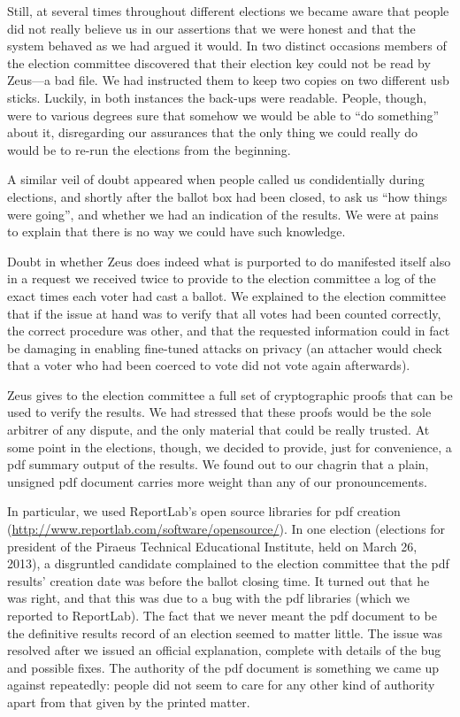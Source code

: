\documentclass[letterpaper,10pt]{article}
\begin{document}
Still, at several times throughout different elections we became aware
that people did not really believe us in our assertions that we were
honest and that the system behaved as we had argued it would. In two
distinct occasions members of the election committee discovered that
their election key could not be read by Zeus---a bad file. We had
instructed them to keep two copies on two different {\sc usb} sticks.
Luckily, in both instances the back-ups were readable. People, though,
were to various degrees sure that somehow we would be able to ``do
something'' about it, disregarding our assurances that the only thing
we could really do would be to re-run the elections from the beginning.

A similar veil of doubt appeared when people called us condidentially
during elections, and shortly after the ballot box had been closed, to
ask us ``how things were going'', and whether we had an indication of
the results. We were at pains to explain that there is no way we could
have such knowledge.

Doubt in whether Zeus does indeed what is purported to do manifested
itself also in a request we received twice to provide to the election
committee a log of the exact times each voter had cast a ballot. We
explained to the election committee that if the issue at hand was to
verify that all votes had been counted correctly, the correct
procedure was other, and that the requested information could in fact
be damaging in enabling fine-tuned attacks on privacy (an attacher
would check that a voter who had been coerced to vote did not vote
again afterwards). 

Zeus gives to the election committee a full set of cryptographic
proofs that can be used to verify the results. We had stressed that
these proofs would be the sole arbitrer of any dispute, and the only
material that could be really trusted. At some point in the elections,
though, we decided to provide, just for convenience, a {\sc pdf}
summary output of the results. We found out to our chagrin that a
plain, unsigned {\sc pdf} document carries more weight than any of our
pronouncements.

In particular, we used ReportLab's open source libraries for {\sc pdf}
creation (\url{http://www.reportlab.com/software/opensource/}). In one
election (elections for president of the Piraeus Technical Educational
Institute, held on March 26, 2013), a disgruntled candidate complained
to the election committee that the {\sc pdf} results' creation date
was before the ballot closing time. It turned out that he was right, and
that this was due to a bug with the {\sc pdf} libraries (which we
reported to ReportLab). The fact that we never meant the {\sc pdf}
document to be the definitive results record of an election seemed to
matter little. The issue was resolved after we issued an official
explanation, complete with details of the bug and possible fixes. The
authority of the {\sc pdf} document is something we came up against
repeatedly: people did not seem to care for any other kind of
authority apart from that given by the printed matter.
\end{document}

